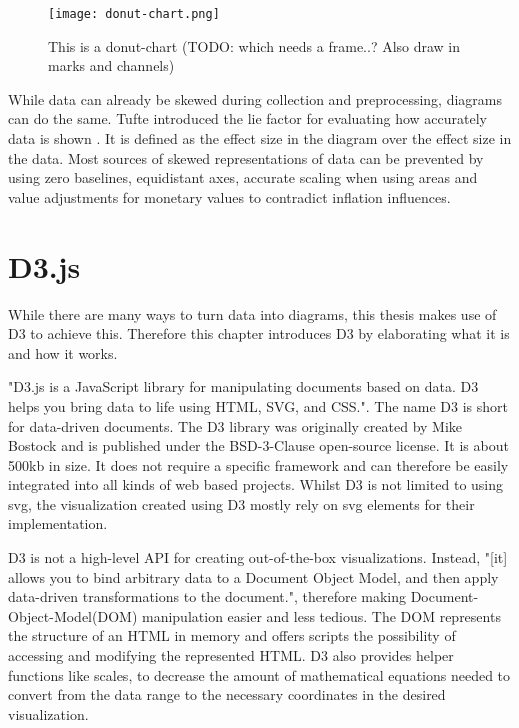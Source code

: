\begin{figure}
    \texttt{[image: donut-chart.png]}
    \captionsetup{width=0.9\textwidth}
    \caption[donut-chart]{This is a donut-chart (TODO: which needs a frame..? Also draw in marks and channels)}
    \label{fig:donut-chart}
\end{figure}

While data can already be skewed during collection and preprocessing, diagrams can do the same. Tufte introduced the lie factor for evaluating how accurately data is shown \cite{tuftevisual}. It is defined as the effect size in the diagram over the effect size in the data. Most sources of skewed representations of data can be prevented by using zero baselines, equidistant axes, accurate scaling when using areas and value adjustments for monetary values to contradict inflation influences.


\section{D3.js}

While there are many ways to turn data into diagrams, this thesis makes use of D3 to achieve this. Therefore this chapter introduces D3 by elaborating what it is and how it works.

"D3.js is a JavaScript library for manipulating documents based on data. D3 helps you bring data to life using HTML, SVG, and CSS."\cite{d3js}. The name D3 is short for data-driven documents. The D3 library was originally created by Mike Bostock and is published under the BSD-3-Clause open-source license. It is about 500kb in size. It does not require a specific framework and can therefore be easily integrated into all kinds of web based projects. Whilst D3 is not limited to using svg, the visualization created using D3 mostly rely on svg elements for their implementation.

D3 is not a high-level API for creating out-of-the-box visualizations. Instead, "[it] allows you to bind arbitrary data to a Document Object Model, and then apply data-driven transformations to the document."\cite{d3js}, therefore making Document-Object-Model(DOM) manipulation easier and less tedious. The DOM represents the structure of an HTML in memory and offers scripts the possibility of accessing and modifying the represented HTML. D3 also provides helper functions like scales, to decrease the amount of mathematical equations needed to convert from the data range to the necessary coordinates in the desired visualization.

